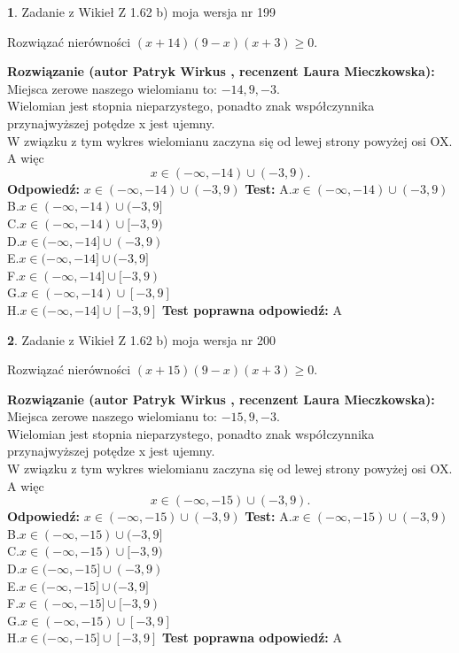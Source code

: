 \documentclass[12pt, a4paper]{article}
\theoremstyle{definition} %
\newtheorem{zad}{}
\newcommand{\zadStart}[1]{\begin{zad}#1\newline}
\newcommand{\zadStop}{\end{zad}}
\newcommand{\rozwStart}[2]{\noindent \textbf{Rozwiązanie (autor #1 , recenzent #2): }\newline}
\newcommand{\rozwStop}{\newline}
\newcommand{\odpStart}{\noindent \textbf{Odpowiedź:}\newline}
\newcommand{\odpStop}{\newline}
\newcommand{\testStart}{\noindent \textbf{Test:}\newline}
\newcommand{\testStop}{\newline}
\newcommand{\kluczStart}{\noindent \textbf{Test poprawna odpowiedź:}\newline}
\newcommand{\kluczStop}{\newline}
\begin{document}
\zadStart{Zadanie z Wikieł Z 1.62 b) moja wersja nr 199}

Rozwiązać nierówności $(x+14)(9-x)(x+3)\ge0$.
\zadStop
\rozwStart{Patryk Wirkus}{Laura Mieczkowska}
Miejsca zerowe naszego wielomianu to: $-14, 9, -3$.\\
Wielomian jest stopnia nieparzystego, ponadto znak współczynnika przy\linebreak najwyższej potędze x jest ujemny.\\ W związku z tym wykres wielomianu zaczyna się od lewej strony powyżej osi OX. A więc $$x \in (-\infty,-14) \cup (-3,9).$$
\rozwStop
\odpStart
$x \in (-\infty,-14) \cup (-3,9)$
\odpStop
\testStart
A.$x \in (-\infty,-14) \cup (-3,9)$\\
B.$x \in (-\infty,-14) \cup (-3,9]$\\
C.$x \in (-\infty,-14) \cup [-3,9)$\\
D.$x \in (-\infty,-14] \cup (-3,9)$\\
E.$x \in (-\infty,-14] \cup (-3,9]$\\
F.$x \in (-\infty,-14] \cup [-3,9)$\\
G.$x \in (-\infty,-14) \cup [-3,9]$\\
H.$x \in (-\infty,-14] \cup [-3,9]$
\testStop
\kluczStart
A
\kluczStop



\zadStart{Zadanie z Wikieł Z 1.62 b) moja wersja nr 200}

Rozwiązać nierówności $(x+15)(9-x)(x+3)\ge0$.
\zadStop
\rozwStart{Patryk Wirkus}{Laura Mieczkowska}
Miejsca zerowe naszego wielomianu to: $-15, 9, -3$.\\
Wielomian jest stopnia nieparzystego, ponadto znak współczynnika przy\linebreak najwyższej potędze x jest ujemny.\\ W związku z tym wykres wielomianu zaczyna się od lewej strony powyżej osi OX. A więc $$x \in (-\infty,-15) \cup (-3,9).$$
\rozwStop
\odpStart
$x \in (-\infty,-15) \cup (-3,9)$
\odpStop
\testStart
A.$x \in (-\infty,-15) \cup (-3,9)$\\
B.$x \in (-\infty,-15) \cup (-3,9]$\\
C.$x \in (-\infty,-15) \cup [-3,9)$\\
D.$x \in (-\infty,-15] \cup (-3,9)$\\
E.$x \in (-\infty,-15] \cup (-3,9]$\\
F.$x \in (-\infty,-15] \cup [-3,9)$\\
G.$x \in (-\infty,-15) \cup [-3,9]$\\
H.$x \in (-\infty,-15] \cup [-3,9]$
\testStop
\kluczStart
A
\kluczStop
\end{document}
